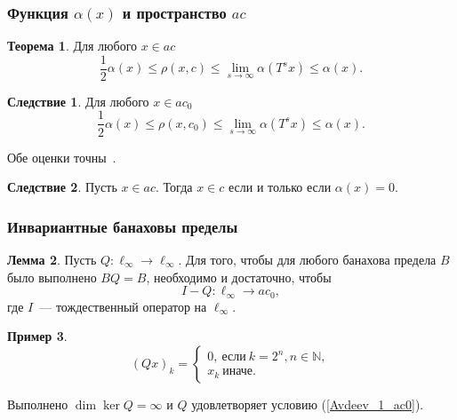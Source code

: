 \documentclass[10pt,pdf,hyperref={unicode},aspectratio=169]{beamer}
\theoremstyle{definition}
\newtheorem{llemma}{Лемма}
\newtheorem{ttheorem}[llemma]{Теорема}
\newtheorem{eexample}[llemma]{Пример}
\newtheorem{ccorollary}{Следствие}[llemma]
\begin{document}
\begin{frame}
	\frametitle{Функция $\alpha(x)$ и пространство $ac$~\cite{our-mz2019ac0}}
	\begin{ttheorem}
		Для любого $x\in ac$
		\begin{equation*}
			\frac{1}{2} \alpha(x) \leq \rho(x,c)\leq \lim_{s\to\infty} \alpha(T^s x) \leq \alpha(x)
			.
		\end{equation*}
	\end{ttheorem}

	\begin{ccorollary}
		Для любого $x\in ac_0$
		\begin{equation*}
			\frac{1}{2} \alpha(x) \leq \rho(x,c_0)\leq \lim_{s\to\infty} \alpha(T^s x) \leq \alpha(x)
			.
		\end{equation*}
	\end{ccorollary}

	Обе оценки точны~\cite{our-ped-2018-alpha-Tx}.

	\begin{ccorollary}
		Пусть $x\in ac$.
		Тогда $x\in c$ если и только если $\alpha(x) = 0$.
	\end{ccorollary}

\end{frame}


\begin{frame}
	\frametitle{Инвариантные банаховы пределы~\cite{our-ped-2018-inf-dim-ker}}
	\begin{llemma}
		Пусть $Q:\ell_\infty \to \ell_\infty$.
		Для того, чтобы для любого банахова предела $B$
		было выполнено $BQ = B$,
		необходимо и достаточно, чтобы
		\begin{equation}\label{Avdeev_1_ac0}
			I-Q : \ell_\infty \to ac_0,
		\end{equation}
		где $I$~--- тождественный оператор на $\ell_\infty$.
	\end{llemma}

	\begin{eexample}
		\begin{equation*}
			(Qx)_k =
			\begin{cases}
				0,~\mbox{если}~ k = 2^n, n \in\mathbb{N},
				\\
				x_k~\mbox{иначе.}
			\end{cases}
		\end{equation*}

		Выполнено $\dim \ker Q = \infty$ и $Q$ удовлетворяет условию (\ref{Avdeev_1_ac0}).
	\end{eexample}


\end{frame}
\end{document}
